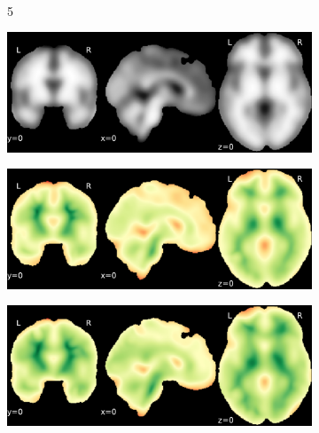 \documentclass{article}
\begin{document}
\begin{appendices}
\begin{landscape}
\begin{figure}
\begin{subfigure}[t]{0.2\paperheight}
            \end{subfigure} \\
            \begin{subfigure}[b][][c]{0.01\paperwidth} 5 \vspace*{15pt} \end{subfigure}
            \begin{subfigure}[t]{0.2\paperheight}
                \centering
                \includegraphics[width=\textwidth]{figures/sig/15mm/ieee_ds001748_sub-adult15.pdf}
            \end{subfigure}
            \begin{subfigure}[t]{0.2\paperheight}
                \centering
                \includegraphics[width=\textwidth]{figures/sig/15mm/rr_ds001748_sub-adult15_sig.pdf}
            \end{subfigure}
            \begin{subfigure}[t]{0.2\paperheight}
                \centering
                \includegraphics[width=\textwidth]{figures/sig/15mm/rs_ds001748_sub-adult15_sig.pdf}

\end{subfigure}
\end{figure}
\end{landscape}
\end{appendices}
\end{document}
